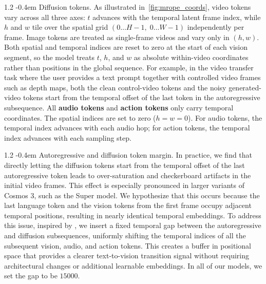 \documentclass{llmxive}
\makeatletter
\providecommand{\paragraph}{  \@startsection{paragraph}{4}{\z@}    {1\baselineskip \@plus .2\baselineskip}    {-0.4em}    {\normalfont\normalsize\bfseries}}
\makeatother
\begin{document}
\paragraph{Diffusion tokens.} As illustrated in~\cref{fig:mrope_coords}, video tokens vary across all three axes: $t$ advances with the temporal latent frame index, while $h$ and $w$ tile over the spatial grid $(0 \ldots H{-}1,\; 0 \ldots W{-}1)$ independently per frame. Image tokens are treated as single-frame videos and vary only in $(h, w)$. Both spatial and temporal indices are reset to zero at the start of each vision segment, so the model treats $t$, $h$, and $w$ as absolute within-video coordinates rather than positions in the global sequence. For example, in the video transfer task where the user provides a text prompt together with controlled video frames such as depth maps, both the clean control-video tokens and the noisy generated-video tokens start from the temporal offset of the last token in the autoregressive subsequence. All \textbf{audio tokens} and \textbf{action tokens} only carry temporal coordinates. The spatial indices are set to zero ($h = w = 0$). For audio tokens, the temporal index advances with each audio hop; for action tokens, the temporal index advances with each sampling step.

\paragraph{Autoregressive and diffusion token margin.} In practice, we find that directly letting the diffusion tokens start from the temporal offset of the last autoregressive token leads to over-saturation and checkerboard artifacts in the initial video frames. This effect is especially pronounced in larger variants of Cosmos 3, such as the Super model. We hypothesize that this occurs because the last language token and the vision tokens from the first frame occupy adjacent temporal positions, resulting in nearly identical temporal embeddings. To address this issue, inspired by \citet{cao2025hunyuanimage}, we insert a fixed temporal gap between the autoregressive and diffusion subsequences, uniformly shifting the temporal indices of all the subsequent vision, audio, and action tokens. This creates a buffer in positional space that provides a clearer text-to-vision transition signal without requiring architectural changes or additional learnable embeddings. In all of our models, we set the gap to be $15000$.
\end{document}
